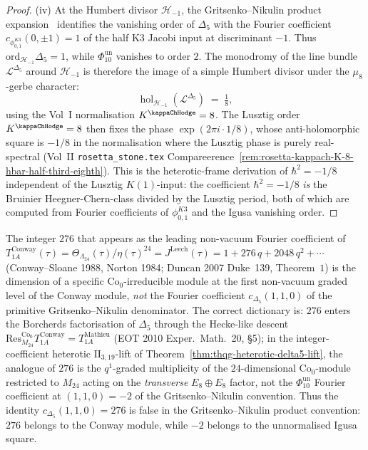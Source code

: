 \begin{proof}
\textup{(iv)} At the Humbert divisor $\mathcal{H}_{-1}$, the
Gritsenko--Nikulin product expansion~\cite[(2.2)]{GritsenkoNikulin1998}
identifies the vanishing order of $\Delta_5$ with the Fourier
coefficient \(c_{\phi_{0,1}^{K3}}(0,\pm1)=1\) of the half K3 Jacobi
input at discriminant \(-1\). Thus
\(\mathrm{ord}_{\mathcal{H}_{-1}}\Delta_5 = 1\), while
\(\Phi_{10}^{\mathrm{un}}\) vanishes to order \(2\). The monodromy of the
line bundle $\mathcal{L}^{\Delta_5}$ around $\mathcal{H}_{-1}$ is
therefore the image of a simple Humbert divisor under the
\(\mu_8\)-gerbe character:
\[
\operatorname{hol}_{\mathcal{H}_{-1}}(\mathcal L^{\Delta_5})
\;=\;
\tfrac{1}{8},
\]
using the Vol~I normalisation \(K^{\kappaChHodge}=8\). The Lusztig order
\(K^{\kappaChHodge}=8\) then fixes the phase
$\exp(2\pi i\cdot 1/8)$, whose anti-holomorphic square is
$-1/8$ in the normalisation where the Lusztig phase is purely
real-spectral (Vol~II \texttt{rosetta\_stone.tex}
Compareerence~\ref{rem:rosetta-kappach-K-8-hbar-half-third-eighth}).
This is the heterotic-frame derivation of $\hbar^2 = -1/8$
independent of the Lusztig $K(1)$-input:
the coefficient $\hbar^2 = -1/8$ \emph{is} the Bruinier
Heegner-Chern-class divided by the Lusztig period, both of
which are computed from Fourier coefficients of
$\phi_{0,1}^{K3}$ and the Igusa vanishing order.
\end{proof}

\begin{remark}
\label{rem:thqg-heterotic-276-conway-not-delta5}
The integer $276$ that appears as the leading non-vacuum Fourier
coefficient of $T_{1A}^{\mathrm{Conway}}(\tau)
= \Theta_{\Lambda_{24}}(\tau)/\eta(\tau)^{24}
= J^{\mathrm{Leech}}(\tau) = 1 + 276\,q + 2048\,q^2 + \cdots$
\textup{(}Conway--Sloane 1988, Norton 1984; Duncan 2007
\textup{Duke}~139, Theorem~$1$\textup{)} is the dimension of a specific
$\mathrm{Co}_0$-irreducible module at the first non-vacuum graded
level of the Conway module, \emph{not} the Fourier coefficient
$c_{\Delta_5}(1, 1, 0)$ of the primitive Gritsenko--Nikulin
denominator. The correct
dictionary is: $276$ enters the Borcherds factorisation of $\Delta_5$
through the Hecke-like descent
$\mathrm{Res}^{\mathrm{Co}_0}_{M_{24}}T_{1A}^{\mathrm{Conway}}
= T_{1A}^{\mathrm{Mathieu}}$ \textup{(}EOT 2010
\textup{Exper.~Math.}~20, \S 5\textup{)}; in the integer-coefficient
heterotic $\mathrm{II}_{3,19}$-lift of
Theorem~\ref{thm:thqg-heterotic-delta5-lift}, the analogue of $276$
is the $q^1$-graded multiplicity of the $24$-dimensional
$\mathrm{Co}_0$-module restricted to $M_{24}$ acting on the
\emph{transverse} $E_8\oplus E_8$ factor, not the $\Phi_{10}^{\mathrm{un}}$
Fourier coefficient at $(1, 1, 0) = -2$ of the Gritsenko--Nikulin
convention. Thus the identity
$c_{\Delta_5}(1, 1, 0) = 276$ is false in the Gritsenko--Nikulin
product convention:
$276$ belongs to the Conway module, while $-2$ belongs to the
unnormalised Igusa square.
\end{remark}

